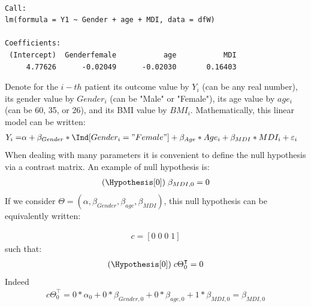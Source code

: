 \documentclass[12pt]{article}
\newcommand\trans[1]{{#1}^\intercal}%
\begin{document}
\begin{verbatim}

Call:
lm(formula = Y1 ~ Gender + age + MDI, data = dfW)

Coefficients:
 (Intercept)  Genderfemale           age           MDI  
     4.77626      -0.02049      -0.02030       0.16403
\end{verbatim}
Denote for the \(i-th\) patient its outcome value by \(Y_i\) (can be
any real number), its gender value by \(Gender_i\) (can be "Male" or
"Female"), its age value by \(age_i\) (can be 60, 35, or 26), and its
BMI value by \(BMI_i\). Mathematically, this linear model can be
written:
\begin{align*}
Y_i =& \alpha + \beta_{Gender} * \Ind[Gender_i="Female"] + \beta_{Age} * Age_i + \beta_{MDI} * MDI_i + \varepsilon_i
\end{align*}
When dealing with many parameters it is convenient to define the null
hypothesis via a contrast matrix. An example of null hypothesis is:
\begin{align*}
(\Hypothesis[0]) \; \beta_{MDI,0} = 0
\end{align*}
If we consider \(\Theta=(\alpha,\beta_{Gender},\beta_{age},\beta_{MDI})\),
this null hypothesis can be equivalently written:

\begin{align*}
c=[0 \; 0 \; 0 \; 1]
\end{align*}
such that: 
\begin{align*}
(\Hypothesis[0]) \; c \trans{\Theta}_{0} = 0
\end{align*}
Indeed
\begin{align*}
c \trans{\Theta}_{0} = 0 * \alpha_0 + 0 * \beta_{Gender,0} + 0 * \beta_{age,0} + 1 * \beta_{MDI,0} = \beta_{MDI,0}
\end{align*}
\end{document}

